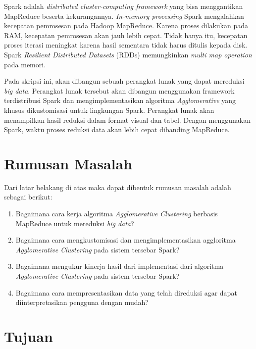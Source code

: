 \documentclass[a4paper,twoside]{article}
\begin{document}
Spark adalah {\it distributed cluster-computing framework} yang bisa menggantikan MapReduce beserta kekurangannya. {\it In-memory processing} Spark mengalahkan kecepatan pemrosesan pada Hadoop MapReduce. Karena proses dilakukan pada RAM, kecepatan pemrosesan akan jauh lebih cepat. Tidak hanya itu, kecepatan proses iterasi meningkat karena  hasil sementara tidak harus ditulis kepada disk. Spark {\it Resilient Distributed Datasets} (RDDs) memungkinkan {\it multi map operation} pada memori.

Pada skripsi ini, akan dibangun sebuah perangkat lunak yang dapat mereduksi {\it big data}. Perangkat lunak tersebut akan dibangun menggunakan framework terdistribusi Spark dan mengimplementasikan algoritma {\it Agglomerative} yang khusus dikustomisasi untuk lingkungan Spark. Perangkat lunak akan menampilkan hasil reduksi dalam format visual dan tabel. Dengan menggunakan Spark, waktu proses reduksi data akan lebih cepat dibanding MapReduce.


\section{Rumusan Masalah}

Dari latar belakang di atas maka dapat dibentuk rumusan masalah adalah sebagai berikut:
\begin{enumerate}

\item Bagaimana cara kerja algoritma {\it Agglomerative Clustering} berbasis MapReduce untuk mereduksi {\it big data}?

\item Bagaimana cara mengkustomisasi dan mengimplementasikan aggloritma {\it Agglomerative Clustering} pada sistem tersebar Spark?

\item Bagaimana mengukur kinerja hasil dari implementasi dari algoritma {\it Agglomerative Clustering} pada sistem tersebar Spark?

\item Bagaimana cara mempresentasikan data yang telah direduksi agar dapat diinterpretasikan pengguna dengan mudah?

\end{enumerate}



\section{Tujuan}
\end{document}
